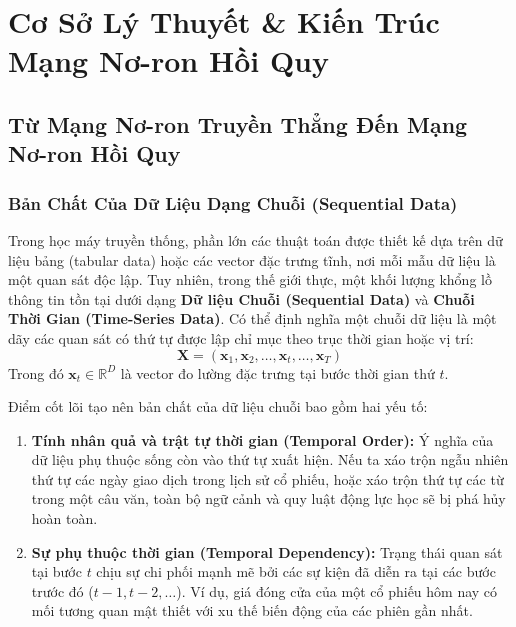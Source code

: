 \documentclass[12pt,a4paper]{report}
\begin{document}
\newpage

\chapter{Cơ Sở Lý Thuyết \& Kiến Trúc Mạng Nơ-ron Hồi Quy}

\section{Từ Mạng Nơ-ron Truyền Thẳng Đến Mạng Nơ-ron Hồi Quy}

\subsection{Bản Chất Của Dữ Liệu Dạng Chuỗi (Sequential Data)}
Trong học máy truyền thống, phần lớn các thuật toán được thiết kế dựa trên dữ liệu bảng (tabular data) hoặc các vector đặc trưng tĩnh, nơi mỗi mẫu dữ liệu là một quan sát độc lập. Tuy nhiên, trong thế giới thực, một khối lượng khổng lồ thông tin tồn tại dưới dạng \textbf{Dữ liệu Chuỗi (Sequential Data)} và \textbf{Chuỗi Thời Gian (Time-Series Data)}. Có thể định nghĩa một chuỗi dữ liệu là một dãy các quan sát có thứ tự được lập chỉ mục theo trục thời gian hoặc vị trí:
\begin{equation}
    \mathbf{X} = (\mathbf{x}_1, \mathbf{x}_2, \dots, \mathbf{x}_t, \dots, \mathbf{x}_T)
\end{equation}
Trong đó $\mathbf{x}_t \in \mathbb{R}^D$ là vector đo lường đặc trưng tại bước thời gian thứ $t$.

Điểm cốt lõi tạo nên bản chất của dữ liệu chuỗi bao gồm hai yếu tố:
\begin{enumerate}
    \item \textbf{Tính nhân quả và trật tự thời gian (Temporal Order):} Ý nghĩa của dữ liệu phụ thuộc sống còn vào thứ tự xuất hiện. Nếu ta xáo trộn ngẫu nhiên thứ tự các ngày giao dịch trong lịch sử cổ phiếu, hoặc xáo trộn thứ tự các từ trong một câu văn, toàn bộ ngữ cảnh và quy luật động lực học sẽ bị phá hủy hoàn toàn.
    \item \textbf{Sự phụ thuộc thời gian (Temporal Dependency):} Trạng thái quan sát tại bước $t$ chịu sự chi phối mạnh mẽ bởi các sự kiện đã diễn ra tại các bước trước đó ($t-1, t-2, \dots$). Ví dụ, giá đóng cửa của một cổ phiếu hôm nay có mối tương quan mật thiết với xu thế biến động của các phiên gần nhất.
\end{enumerate}
\end{document}

